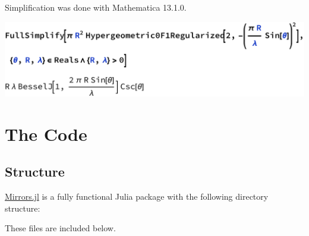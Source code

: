 \documentclass[etd,twoside,senior,noacknowledgments]{BYUPhys}
\begin{document}
\begin{appendices}
  Simplification was done with Mathematica 13.1.0.
  
  \includegraphics[width=\textwidth]{airy-simplification.pdf}
  
  
  
  \chapter{The Code}\label{chap:julia}
  
  \section{Structure}
  
  \href{https://github.com/mjg0/Mirrors.jl}{Mirrors.jl} is a fully functional Julia package with the following directory structure:
  
  
  
  These files are included below.
  
  \begin{tiny}
    
  \end{tiny}
  
\end{appendices}








\printindex
\end{document}
